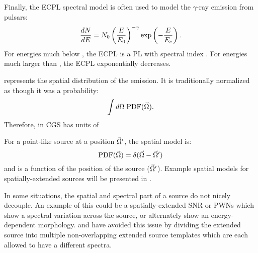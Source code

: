 Finally, the \ac{ECPL} spectral model is often used to model the
$\gamma$-ray emission from pulsars:
\begin{equation}
  \frac{dN}{dE} = N_0 \left(\frac{E}{E_0}\right)^{-\gamma}
  \exp\left(-\frac{E}{E_c}\right).
\end{equation}
For energies much below \Ecutoff, the \ac{ECPL} is a \ac{PL} with
spectral index \spectralindex.  For energies much larger than \Ecutoff,
the \ac{ECPL} exponentially decreases.

\pdf represents the spatial distribution of the emission.  It is
traditionally normalized as though it was a probability:
\begin{equation}
  \int d\Omega \; \text{PDF}(\vec\Omega).
\end{equation}
Therefore, in \ac{CGS} \pdf has units of \pdfunits

For a point-like source at a position $\vec\Omega'$, the spatial
model is:
\begin{equation}
  \text{PDF}(\vec\Omega) = \delta(\vec\Omega - \vec\Omega')
\end{equation}
and is a function of the position of the source ($\vec\Omega'$).
Example spatial models for spatially-extended sources will be presented
in .

In some situations, the spatial and spectral part of a
source do not nicely decouple.  An example of this could be a
spatially-extended \acs{SNR} or \acp{PWN} which show a spectral
variation across the source, or alternately show an energy-dependent
morphology.  \cite{katsuta_2012_fermi-lat-observation} and
\cite{hewitt_2012_fermi-lat-observations} have avoided this issue by
dividing the extended source into multiple non-overlapping extended source
templates which are each allowed to have a different spectra.
